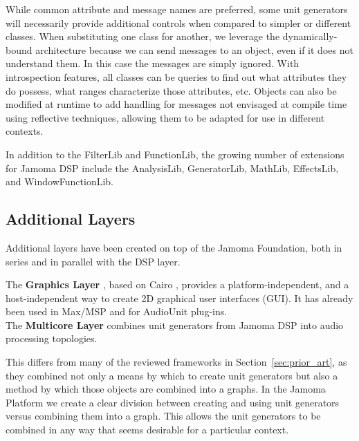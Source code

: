 \documentclass[twoside,10pt]{article}
\begin{document}
While common attribute and message names are preferred, some unit generators will necessarily provide additional controls when compared to simpler or different classes.  When substituting one class for another, we leverage the dynamically-bound architecture because we can send messages to an object, even if it does not understand them.  In this case the messages are simply ignored.  With introspection features, all classes can be queries to find out what attributes they do possess, what ranges characterize those attributes, etc.  Objects can also be modified at runtime to add handling for messages not envisaged at compile time using reflective techniques, allowing them to be adapted for use in different contexts.

In addition to the FilterLib and FunctionLib, the growing number of extensions for Jamoma DSP include the AnalysisLib, GeneratorLib, MathLib, EffectsLib, and WindowFunctionLib.




\subsection{Additional Layers} %

Additional layers have been created on top of the Jamoma Foundation, both in series and in parallel with the DSP layer.  

The \textbf{Graphics Layer} \cite{web10}, based on Cairo \cite{web11}, provides a platform-independent, and a host-independent way to create 2D graphical user interfaces (GUI). It has already been used in Max/MSP and for AudioUnit plug-ins.\\

The \textbf{Multicore Layer} \cite{web12} combines unit generators from Jamoma DSP into audio processing topologies.

This differs from many of the reviewed frameworks in Section~\ref{sec:prior_art}, as they combined not only a means by which to create unit generators but also a method by which those objects are combined into a graphs.  In the Jamoma Platform we create a clear division between creating and using unit generators versus combining them into a graph.  This allows the unit generators to be combined in any way that seems desirable for a particular context. %
\end{document}
